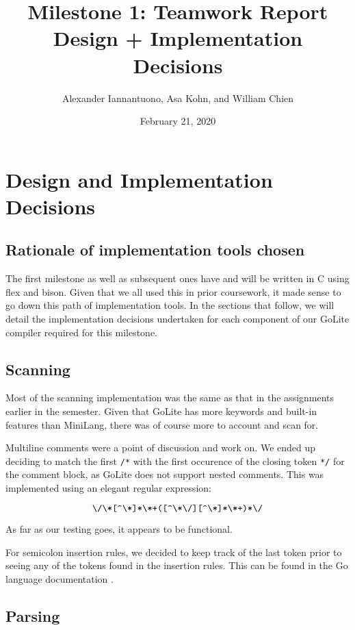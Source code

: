 \documentclass{article}
\title{
    Milestone 1: Teamwork Report\\
    \large Design + Implementation Decisions
}
\author{Alexander Iannantuono, Asa Kohn, and William Chien}
\date{February 21, 2020}
\begin{document}
\maketitle

\section{Design and Implementation Decisions}

\subsection{Rationale of implementation tools chosen}

The first milestone as well as subsequent ones have and will be written in C
using flex and bison. Given that we all used this in prior coursework, it made
sense to go down this path of implementation tools. In the sections
that follow, we will detail the implementation decisions undertaken for each
component of our GoLite compiler required for this milestone.

\subsection{Scanning}

Most of the scanning implementation was the same as that in the assignments
earlier in the semester. Given that GoLite has more keywords and built-in
features than MiniLang, there was of course more to account and scan for.

Multiline comments were a point of discussion and work on. We ended up deciding
to match the first \verb|/*| with the first occurence of the closing token \verb|*/|
for the comment block, as GoLite does not support nested comments.
This was implemented using an elegant regular expression:

\[
    \verb|\/\*[^\*]*\*+([^\*\/][^\*]*\*+)*\/|
\]

As far as our testing goes, it appears to be functional.

For semicolon insertion rules, we decided to keep track of the last token prior
to seeing any of the tokens found in the insertion rules. This can be found in
the Go language documentation \cite{gosemi}.


\subsection{Parsing}
\end{document}
